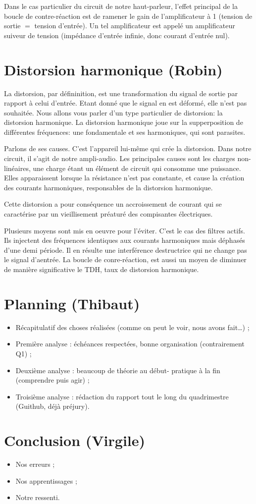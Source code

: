 \documentclass{article}
\begin{document}
Dans le cas particulier du circuit de notre haut-parleur, l'effet principal de la boucle de contre-réaction
est de ramener le gain de l'amplificateur à 1 (tension de sortie $=$ tension d'entrée). Un tel amplificateur
est appelé un amplificateur suiveur de tension (impédance d'entrée infinie, donc courant d'entrée nul).

\section{Distorsion harmonique (Robin)}

La distorsion, par défininition, est une transformation du signal de sortie par rapport à celui
d'entrée. Etant donné que le signal en est déformé, elle n'est pas souhaitée.
Nous allons vous parler d'un type particulier de distorsion: la distorsion harmonique.
La distorsion harmonique joue sur la supperposition de différentes fréquences: une fondamentale 
et ses harmoniques, qui sont parasites. 

Parlons de ses causes. C'est l'appareil lui-même qui crée la distorsion. Dans notre circuit, il 
s'agit de notre ampli-audio. Les principales causes sont les charges non-linéaires, une charge étant 
un élément de circuit qui consomme une puissance. Elles apparaissent lorsque la résistance n'est pas constante, 
et  cause la création des courants harmoniques, responsables de la distorsion harmonique. 

Cette distorsion a pour conséquence un accroissement de courant qui se caractérise par un vieillisement 
préaturé des compisantes électriques.

Plusieurs moyens sont mis en oeuvre pour l'éviter. C'est le cas des filtres actifs. Ils injectent des fréquences 
identiques aux courants harmoniques mais déphasés d'une demi période. Il en résulte une interférence destructrice 
qui ne change pas le signal d'aentrée. La boucle de conre-réaction, est aussi un moyen de diminuer de manière significative
le TDH, taux de distorsion harmonique.

\section{Planning (Thibaut)}

\begin{itemize}
	\item Récapitulatif des choses réalisées (comme on peut le voir, nous avons fait…) ;
	\item Première analyse : échéances respectées, bonne organisation (contrairement Q1) ;
	\item Deuxième analyse : beaucoup de théorie au début- pratique à la fin  (comprendre puis agir) ;
	\item Troisième analyse : rédaction du rapport tout le long du quadrimestre (Guithub, déjà préjury).
\end{itemize}

\section{Conclusion (Virgile)}
\begin{itemize}
    \item Nos erreurs ;
    \item Nos apprentissages ;
    \item Notre ressenti.
\end{itemize}
		
\end{document}
